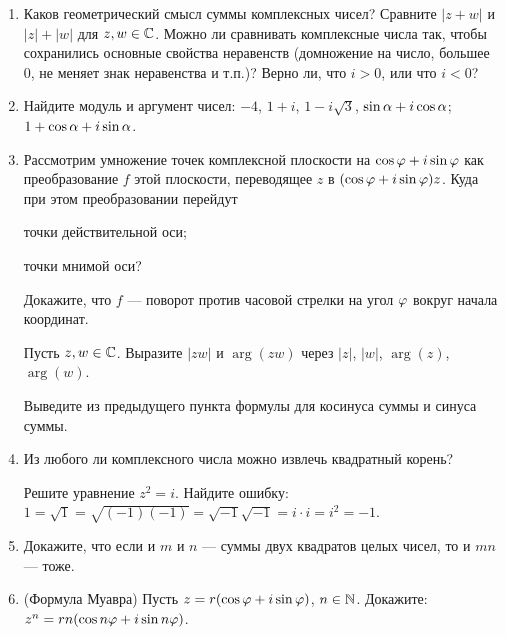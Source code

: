\begin{enumerate}
\item \ipunkt Каков геометрический смысл суммы комплексных чисел? \ipunkt  Сравните $|z + w|$ и $|z| + |w|$ для
$z, w \in \mathbb C$. \ipunkt *Можно ли сравнивать комплексные числа так, чтобы сохранились основные свойства неравенств
(домножение на число, большее 0, не меняет знак неравенства и т.п.)? Верно ли, что $i > 0$, или что $i < 0$?

\item  Найдите модуль и аргумент чисел: \ipunkt  $-4$, $1 + i$, $1 - i\sqrt 3$, $\sin \alpha + i \cos \alpha$; \ipunkt  $1 + \cos \alpha + i \sin \alpha$.
\item  Рассмотрим умножение точек комплексной плоскости на $\cos \varphi + i \sin \varphi$ как преобразование $f$ этой
плоскости, переводящее $z$ в $(\cos \varphi + i \sin \varphi)z$. Куда при этом преобразовании перейдут

\noindent\ipunkt  точки действительной оси;

\noindent\ipunkt  точки мнимой оси?

\noindent\ipunkt  Докажите, что $f$ — поворот против часовой стрелки на угол $\varphi$ вокруг начала координат.

\noindent\ipunkt  Пусть $z, w \in\mathbb C$. Выразите $|zw|$ и $\arg (zw)$ через $|z|$, $|w|$, $\arg (z)$, $\arg (w)$.

\noindent\ipunkt  Выведите из предыдущего пункта формулы для косинуса суммы и синуса суммы.

\item  \ipunkt Из любого ли комплексного числа можно извлечь  квадратный  корень?

\ipunkt Решите уравнение $z^2 = i$. \ipunkt  Найдите ошибку: $1 = \sqrt1 = \sqrt{(-1)(-1)} = \sqrt{-1}\sqrt{-1} = i\cdot i = i^2 = -1$.
\item  Докажите, что если и $m$ и $n$ — суммы двух квадратов целых чисел, то и $mn$ — тоже.
\item  (Формула Муавра) Пусть $z = r(\cos \varphi + i \sin \varphi)$, $n \in \mathbb N$. Докажите: $z^n = rn (\cos n\varphi + i \sin n\varphi)$.


\end{enumerate}
